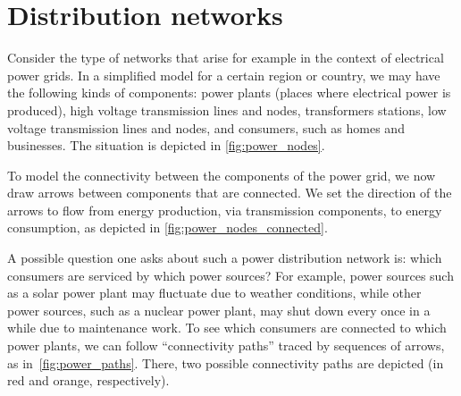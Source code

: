
\section{Distribution networks}\label{sec:connection-distribution-networks}
Consider the type of networks that arise for example in the context of electrical power grids.
In a simplified model for a certain region or country, we may have the following kinds of components: power plants (places where electrical power is produced), high voltage transmission lines and nodes, transformers stations, low voltage transmission lines and nodes, and consumers, such as homes and businesses.
The situation is depicted in \cref{fig:power_nodes}.

\begin{figure*}[p]
    \centering
    \caption{Components of electrical power grids.}
    \label{fig:power_nodes}
\end{figure*}
To model the connectivity between the components of the power grid, we now draw arrows between components that are connected.
We set the direction of the arrows to flow from energy production, via transmission components, to energy consumption, as depicted in \cref{fig:power_nodes_connected}.
\begin{figure*}[p]
    \centering
    \caption{Connectivity between components in electric power grids.}
    \label{fig:power_nodes_connected}
\end{figure*}

A possible question one asks about such a power distribution network is: which consumers are serviced by which power sources?
For example, power sources such as a solar power plant may fluctuate due to weather conditions, while other power sources, such as a nuclear power plant, may shut down every once in a while due to maintenance work.
To see which consumers are connected to which power plants, we can follow ``connectivity paths'' traced by sequences of arrows, as in~\cref{fig:power_paths}.
There, two possible connectivity paths are depicted (in red and orange, respectively).

\begin{figure*}[p]
    \centering
    \caption{Connection between consumers and power plants.}
    \label{fig:power_paths}
\end{figure*}

